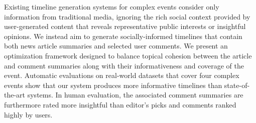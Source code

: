 Existing timeline generation systems for complex events consider only information from traditional media, ignoring the rich social context provided by user-generated content that reveals representative public interests or insightful opinions. We instead aim to generate socially-informed timelines that contain both news article summaries and selected user comments. We present an optimization framework designed to balance topical cohesion between the article and comment summaries along with their informativeness and coverage of the event. Automatic evaluations on real-world datasets that cover four complex events show that our system produces more informative timelines than state-of-the-art systems. In human evaluation, the associated comment summaries are furthermore rated more insightful than editor's picks and comments ranked highly by users.
